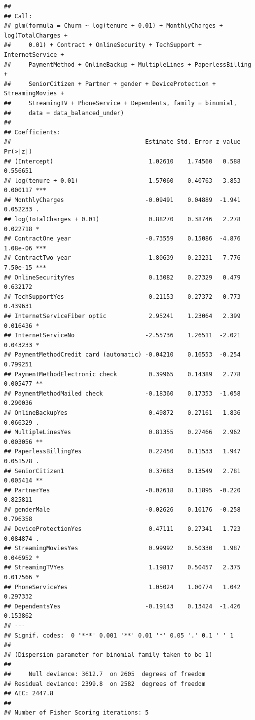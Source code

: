 \documentclass[
  twoside]{article}
\begin{document}
\begin{verbatim}
## 
## Call:
## glm(formula = Churn ~ log(tenure + 0.01) + MonthlyCharges + log(TotalCharges + 
##     0.01) + Contract + OnlineSecurity + TechSupport + InternetService + 
##     PaymentMethod + OnlineBackup + MultipleLines + PaperlessBilling + 
##     SeniorCitizen + Partner + gender + DeviceProtection + StreamingMovies + 
##     StreamingTV + PhoneService + Dependents, family = binomial, 
##     data = data_balanced_under)
## 
## Coefficients:
##                                      Estimate Std. Error z value Pr(>|z|)    
## (Intercept)                           1.02610    1.74560   0.588 0.556651    
## log(tenure + 0.01)                   -1.57060    0.40763  -3.853 0.000117 ***
## MonthlyCharges                       -0.09491    0.04889  -1.941 0.052233 .  
## log(TotalCharges + 0.01)              0.88270    0.38746   2.278 0.022718 *  
## ContractOne year                     -0.73559    0.15086  -4.876 1.08e-06 ***
## ContractTwo year                     -1.80639    0.23231  -7.776 7.50e-15 ***
## OnlineSecurityYes                     0.13082    0.27329   0.479 0.632172    
## TechSupportYes                        0.21153    0.27372   0.773 0.439631    
## InternetServiceFiber optic            2.95241    1.23064   2.399 0.016436 *  
## InternetServiceNo                    -2.55736    1.26511  -2.021 0.043233 *  
## PaymentMethodCredit card (automatic) -0.04210    0.16553  -0.254 0.799251    
## PaymentMethodElectronic check         0.39965    0.14389   2.778 0.005477 ** 
## PaymentMethodMailed check            -0.18360    0.17353  -1.058 0.290036    
## OnlineBackupYes                       0.49872    0.27161   1.836 0.066329 .  
## MultipleLinesYes                      0.81355    0.27466   2.962 0.003056 ** 
## PaperlessBillingYes                   0.22450    0.11533   1.947 0.051578 .  
## SeniorCitizen1                        0.37683    0.13549   2.781 0.005414 ** 
## PartnerYes                           -0.02618    0.11895  -0.220 0.825811    
## genderMale                           -0.02626    0.10176  -0.258 0.796358    
## DeviceProtectionYes                   0.47111    0.27341   1.723 0.084874 .  
## StreamingMoviesYes                    0.99992    0.50330   1.987 0.046952 *  
## StreamingTVYes                        1.19817    0.50457   2.375 0.017566 *  
## PhoneServiceYes                       1.05024    1.00774   1.042 0.297332    
## DependentsYes                        -0.19143    0.13424  -1.426 0.153862    
## ---
## Signif. codes:  0 '***' 0.001 '**' 0.01 '*' 0.05 '.' 0.1 ' ' 1
## 
## (Dispersion parameter for binomial family taken to be 1)
## 
##     Null deviance: 3612.7  on 2605  degrees of freedom
## Residual deviance: 2399.8  on 2582  degrees of freedom
## AIC: 2447.8
## 
## Number of Fisher Scoring iterations: 5
\end{verbatim}
\end{document}
